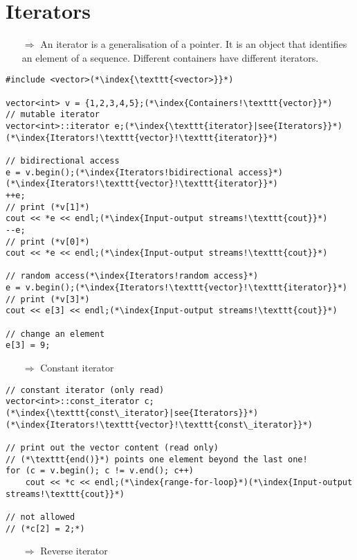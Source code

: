 \documentclass[10pt]{article}
\begin{document}
\section{Iterators}
\small
\begin{enumerate}
\item[$\Rightarrow$] An iterator is a generalisation of a pointer. It is an object that identifies an element of a sequence. Different containers have
different iterators.
\end{enumerate}
\begin{lstlisting}
#include <vector>(*\index{\texttt{<vector>}}*)

vector<int> v = {1,2,3,4,5};(*\index{Containers!\texttt{vector}}*)
// mutable iterator
vector<int>::iterator e;(*\index{\texttt{iterator}|see{Iterators}}*)(*\index{Iterators!\texttt{vector}!\texttt{iterator}}*)

// bidirectional access
e = v.begin();(*\index{Iterators!bidirectional access}*)(*\index{Iterators!\texttt{vector}!\texttt{iterator}}*)
++e;
// print (*v[1]*)
cout << *e << endl;(*\index{Input-output streams!\texttt{cout}}*)
--e;
// print (*v[0]*)
cout << *e << endl;(*\index{Input-output streams!\texttt{cout}}*)

// random access(*\index{Iterators!random access}*)
e = v.begin();(*\index{Iterators!\texttt{vector}!\texttt{iterator}}*)
// print (*v[3]*)
cout << e[3] << endl;(*\index{Input-output streams!\texttt{cout}}*)

// change an element
e[3] = 9;
\end{lstlisting}
\begin{enumerate}
\item[$\Rightarrow$] Constant iterator
\end{enumerate}
\begin{lstlisting}
// constant iterator (only read)
vector<int>::const_iterator c;(*\index{\texttt{const\_iterator}|see{Iterators}}*)(*\index{Iterators!\texttt{vector}!\texttt{const\_iterator}}*)

// print out the vector content (read only)
// (*\texttt{end()}*) points one element beyond the last one!
for (c = v.begin(); c != v.end(); c++)
    cout << *c << endl;(*\index{range-for-loop}*)(*\index{Input-output streams!\texttt{cout}}*)

// not allowed
// (*c[2] = 2;*)
\end{lstlisting}
\begin{enumerate}
\item[$\Rightarrow$] Reverse iterator
\end{enumerate}
\end{document}
